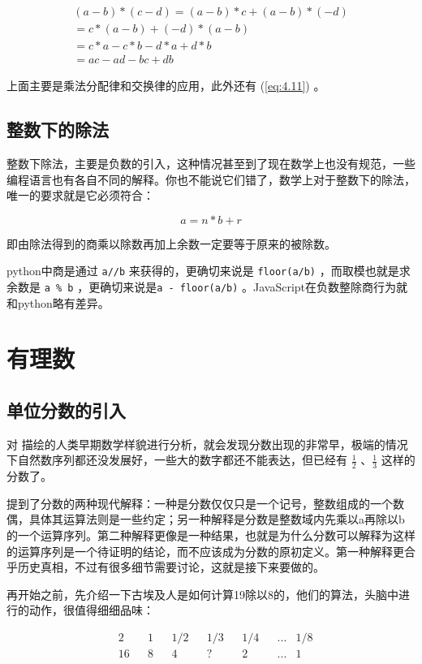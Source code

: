 \documentclass[12pt,oneside]{book}
\begin{document}
\begin{align*}
(a-b) * (c-d) = (a-b) * c + (a-b) *(-d)\\
= c*(a-b) + (-d) * (a-b) \\
= c*a  - c*b -d*a + d*b\\
= ac -ad -bc +db
\end{align*}

上面主要是乘法分配律和交换律的应用，此外还有 (\ref{eq:4.11}) 。

\section{整数下的除法}
整数下除法，主要是负数的引入，这种情况甚至到了现在数学上也没有规范，一些编程语言也有各自不同的解释。你也不能说它们错了，数学上对于整数下的除法，唯一的要求就是它必须符合：

\[
a = n*b + r
\]

即由除法得到的商乘以除数再加上余数一定要等于原来的被除数。

python中商是通过 \verb+a//b+ 来获得的，更确切来说是 \verb+floor(a/b)+ ，而取模也就是求余数是 \verb+a % b+ ，更确切来说是\verb+a - floor(a/b)+ 。JavaScript在负数整除商行为就和python略有差异。



\chapter{有理数}
\section{单位分数的引入}
对 \cite{古今数学思想} 描绘的人类早期数学样貌进行分析，就会发现分数出现的非常早，极端的情况下自然数序列都还没发展好，一些大的数字都还不能表达，但已经有 $\frac{1}{2}$ 、$\frac{1}{3}$ 这样的分数了。

\cite{高观点下的初等数学第一卷} 提到了分数的两种现代解释：一种是分数仅仅只是一个记号，整数组成的一个数偶，具体其运算法则是一些约定；另一种解释是分数是整数域内先乘以a再除以b的一个运算序列。第二种解释更像是一种结果，也就是为什么分数可以解释为这样的运算序列是一个待证明的结论，而不应该成为分数的原初定义。第一种解释更合乎历史真相，不过有很多细节需要讨论，这就是接下来要做的。

再开始之前，先介绍一下古埃及人是如何计算19除以8的，他们的算法，头脑中进行的动作，很值得细细品味：

\begin{align*}
&2   &  &1   &  &1/2  &  &1/3  &  &1/4  & &...   &1/8\\
&16 &   &8    &   &4  &   &?       &  &2     &  &...  &1
\end{align*}
\end{document}
